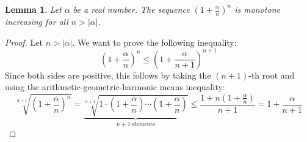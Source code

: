 \documentclass[12pt]{article}
\newtheorem*{lemma}{Lemma}
\begin{document}
\begin{lemma}
Let $\alpha$ be a real number. The sequence
$(1+\frac{\alpha}{n})^n$ is monotone increasing for all $n>
|\alpha|$.
\end{lemma}

\begin{proof}
Let $n>|\alpha|$. We want to prove the following inequality:
\[
\left(1+\frac{\alpha}{n}\right)^n \leq
\left(1+\frac{\alpha}{n+1}\right)^{n+1}
\]
Since both sides are positive, this follows by taking the
$(n+1)$-th root and using the arithmetic-geometric-harmonic means
inequality:
\[
\sqrt[n+1]{\left(1+\frac{\alpha}{n}\right)^n} =
\underbrace{\sqrt[n+1]{1\cdot \left(1+\frac{\alpha}{n}\right)
\cdots \left(1+\frac{\alpha}{n}\right)} }_{\textrm{$n+1$ elements}
} \leq \frac{1+n\left(1+\frac{\alpha}{n}\right)}{n+1} =
1+\frac{\alpha}{n+1}
\]
\end{proof}

\end{document}
